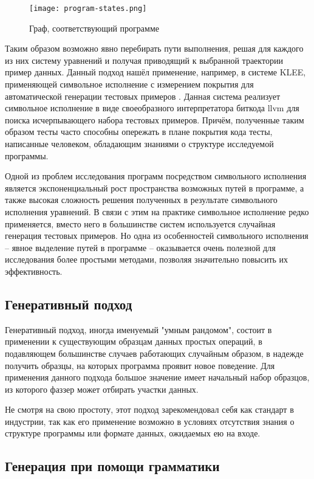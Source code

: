 \begin{figure}[h]
	\centering
	\texttt{[image: program-states.png]}
	\caption{Граф, соответствующий программе}
	\label{fig:py-control-flow-graph}
\end{figure}%

Таким образом возможно явно перебирать пути выполнения, решая для каждого из них систему уравнений и получая приводящий к выбранной траектории пример данных. Данный подход нашёл применение, например, в системе KLEE, применяющей символьное исполнение с измерением покрытия для автоматической генерации тестовых примеров \cite{klee}. Данная система реализует символьное исполнение в виде своеобразного интерпретатора биткода llvm для поиска исчерпывающего набора тестовых примеров. Причём, полученные таким образом тесты часто способны опережать в плане покрытия кода тесты, написанные человеком, обладающим знаниями о структуре исследуемой программы.

Одной из проблем исследования программ посредством символьного исполнения является экспоненциальный рост пространства возможных путей в программе, а также высокая сложность решения полученных в результате символьного исполнения уравнений. В связи с этим на практике символьное исполнение редко применяется, вместо него в большинстве систем используется случайная генерация тестовых примеров. Но одна из особенностей символьного исполнения -- явное выделение путей в программе -- оказывается очень полезной для исследования более простыми методами, позволяя значительно повысить их эффективность.

\subsection{Генеративный подход}

Генеративный подход, иногда именуемый "умным рандомом", состоит в применении к существующим образцам данных простых операций, в подавляющем большинстве случаев работающих случайным образом, в надежде получить образцы, на которых программа проявит новое поведение. Для применения данного подхода большое значение имеет начальный набор образцов, из которого фаззер может отбирать участки данных.

Не смотря на свою простоту, этот подход зарекомендовал себя как стандарт в индустрии, так как его применение возможно в условиях отсутствия знания о структуре программы или формате данных, ожидаемых ею на входе.

\subsection{Генерация при помощи грамматики}

